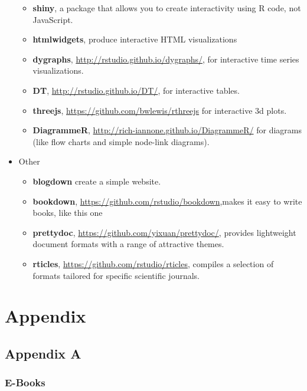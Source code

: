\documentclass[]{book}
\providecommand{\tightlist}{%
  \setlength{\itemsep}{0pt}\setlength{\parskip}{0pt}}
\begin{document}
\begin{itemize}
  \begin{itemize}
  \tightlist
  \item
    \textbf{shiny}, a package that allows you to create interactivity
    using R code, not JavaScript.
  \item
    \textbf{htmlwidgets}, produce interactive HTML visualizations
  \item
    \textbf{dygraphs}, \url{http://rstudio.github.io/dygraphs/}, for
    interactive time series visualizations.
  \item
    \textbf{DT}, \url{http://rstudio.github.io/DT/}, for interactive
    tables.
  \item
    \textbf{threejs}, \url{https://github.com/bwlewis/rthreejs} for
    interactive 3d plots.
  \item
    \textbf{DiagrammeR}, \url{http://rich-iannone.github.io/DiagrammeR/}
    for diagrams (like flow charts and simple node-link diagrams).
  \end{itemize}
\item
  Other

  \begin{itemize}
  \tightlist
  \item
    \textbf{blogdown} create a simple website.
  \item
    \textbf{bookdown}, \url{https://github.com/rstudio/bookdown},makes
    it easy to write books, like this one
  \item
    \textbf{prettydoc}, \url{https://github.com/yixuan/prettydoc/},
    provides lightweight document formats with a range of attractive
    themes.
  \item
    \textbf{rticles}, \url{https://github.com/rstudio/rticles}, compiles
    a selection of formats tailored for specific scientific journals.
  \end{itemize}
\end{itemize}

\part{Appendix}\label{part-appendix}

\chapter{Appendix A}\label{appendix-resources}

\section{E-Books}\label{e-books}
\end{document}

